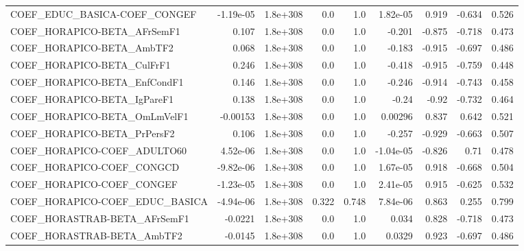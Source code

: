 \begin{tabular}{lrrrrrrrr}
COEF\_EDUC\_BASICA-COEF\_CONGEF          &   -1.19e-05 &     1.8e+308 &     0.0 &      1.0 &   1.82e-05 &       0.919 &       -0.634 &         0.526 \\
COEF\_HORAPICO-BETA\_AFrSemF1           &       0.107 &     1.8e+308 &     0.0 &      1.0 &     -0.201 &      -0.875 &       -0.718 &         0.473 \\
COEF\_HORAPICO-BETA\_AmbTF2             &       0.068 &     1.8e+308 &     0.0 &      1.0 &     -0.183 &      -0.915 &       -0.697 &         0.486 \\
COEF\_HORAPICO-BETA\_CulFrF1            &       0.246 &     1.8e+308 &     0.0 &      1.0 &     -0.418 &      -0.915 &       -0.759 &         0.448 \\
COEF\_HORAPICO-BETA\_EnfCondF1          &       0.146 &     1.8e+308 &     0.0 &      1.0 &     -0.246 &      -0.914 &       -0.743 &         0.458 \\
COEF\_HORAPICO-BETA\_IgPareF1           &       0.138 &     1.8e+308 &     0.0 &      1.0 &      -0.24 &       -0.92 &       -0.732 &         0.464 \\
COEF\_HORAPICO-BETA\_OmLmVelF1          &    -0.00153 &     1.8e+308 &     0.0 &      1.0 &    0.00296 &       0.837 &        0.642 &         0.521 \\
COEF\_HORAPICO-BETA\_PrPersF2           &       0.106 &     1.8e+308 &     0.0 &      1.0 &     -0.257 &      -0.929 &       -0.663 &         0.507 \\
COEF\_HORAPICO-COEF\_ADULTO60           &    4.52e-06 &     1.8e+308 &     0.0 &      1.0 &  -1.04e-05 &      -0.826 &         0.71 &         0.478 \\
COEF\_HORAPICO-COEF\_CONGCD             &   -9.82e-06 &     1.8e+308 &     0.0 &      1.0 &   1.67e-05 &       0.918 &       -0.668 &         0.504 \\
COEF\_HORAPICO-COEF\_CONGEF             &   -1.23e-05 &     1.8e+308 &     0.0 &      1.0 &   2.41e-05 &       0.915 &       -0.625 &         0.532 \\
COEF\_HORAPICO-COEF\_EDUC\_BASICA        &   -4.94e-06 &     1.8e+308 &   0.322 &    0.748 &   7.84e-06 &       0.863 &        0.255 &         0.799 \\
COEF\_HORASTRAB-BETA\_AFrSemF1          &     -0.0221 &     1.8e+308 &     0.0 &      1.0 &      0.034 &       0.828 &       -0.718 &         0.473 \\
COEF\_HORASTRAB-BETA\_AmbTF2            &     -0.0145 &     1.8e+308 &     0.0 &      1.0 &     0.0329 &       0.923 &       -0.697 &         0.486 \\

\end{tabular}
